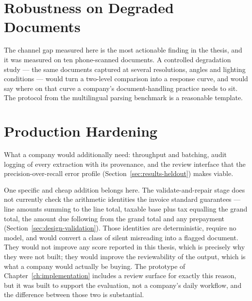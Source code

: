 \section{Robustness on Degraded Documents}
\label{sec:fw-robustness}

The channel gap measured here is the most actionable finding in the thesis, and it was measured on
ten phone-scanned documents. A controlled degradation study --- the same documents captured at
several resolutions, angles and lighting conditions --- would turn a two-level comparison into a
response curve, and would say where on that curve a company's document-handling practice needs to
sit. The protocol from the multilingual parsing benchmark \parencite{mdpbench2026} is a reasonable
template.

\section{Production Hardening}
\label{sec:fw-production}

What a company would additionally need: throughput and batching, audit logging of every extraction
with its provenance, and the review interface that the precision-over-recall error profile
(Section~\ref{sec:results-heldout}) makes viable.

One specific and cheap addition belongs here. The validate-and-repair stage does not currently
check the arithmetic identities the invoice standard guarantees --- line amounts summing to the
line total, taxable base plus tax equalling the grand total, the amount due following from the
grand total and any prepayment (Section~\ref{sec:design-validation}). Those identities are
deterministic, require no model, and would convert a class of silent misreading into a flagged
document. They would not improve any score reported in this thesis, which is precisely why they
were not built; they would improve the reviewability of the output, which is what a company would
actually be buying. The prototype of
Chapter~\ref{ch:implementation} includes a review surface for exactly this reason, but it was
built to support the evaluation, not a company's daily workflow, and the difference between
those two is substantial.
